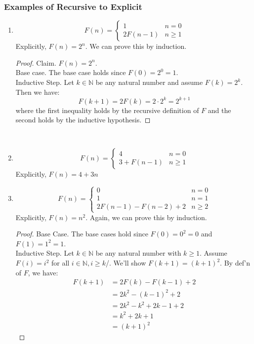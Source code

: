 \documentclass{article}
\begin{document}
\subsubsection{Examples of Recursive to Explicit}
\begin{enumerate}
    \item $$F(n) = \begin{cases}
    1 & n = 0\\
    2F(n-1) & n \geq 1
    \end{cases}$$
    Explicitly, $F(n) = 2^n$. We can prove this by induction.
    \begin{proof}
    Claim. $F(n) = 2^n$.\\
    Base case. The base case holds since $F(0) = 2^0 = 1$.\\
    Inductive Step. Let $k \in \mathbb{N}$ be any natural number and assume $F(k) = 2^k$. Then we have:
    $$F(k + 1) = 2F(k) = 2 \cdot 2^k = 2^{k + 1}$$
    where the first inequality holds by the recursive definition of $F$ and the second holds by the inductive hypothesis.
    \end{proof}\\
    
    \item $$F(n) = \begin{cases}
    4 & n = 0\\
    3 + F(n -1) & n \geq 1
    \end{cases}$$
    Explicitly, $F(n) = 4 + 3n$\\
    
    \item $$F(n) = \begin{cases}
    0 & n = 0\\
    1 & n = 1\\
    2F(n - 1) - F(n - 2) + 2 & n \geq 2
    \end{cases}$$
    Explicitly, $F(n) = n^2$. Again, we can prove this by induction.
    \begin{proof}
    Base Case. The base cases hold since $F(0) = 0^2 = 0$ and $F(1) = 1^2 = 1$.\\
    Inductive Step. Let $k \in \mathbb{N}$ be any natural number with $k \geq 1$. Assume $F(i) = i^2$ for all $i \in \mathbb{N}, i \geq k$/. We'll show $F(k + 1) = (k + 1)^2.$ By def'n of $F$, we have:
    \begin{align*}
        F(k + 1) & = 2F(k) - F(k - 1) + 2\\
        & = 2k^2 - (k-1)^2 + 2\\
        & = 2k^2 - k^2 + 2k - 1 + 2\\
        & = k^2 + 2k + 1\\
        & = (k+1)^2
    \end{align*}
    \end{proof}
\end{enumerate}
\end{document}
